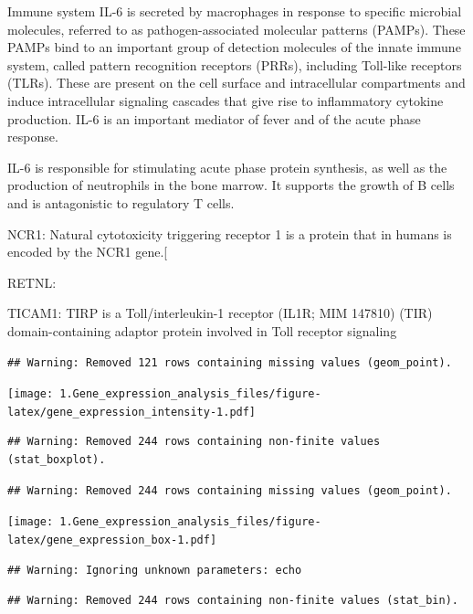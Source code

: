 \documentclass[
]{article}
\begin{document}
Immune system IL-6 is secreted by macrophages in response to specific
microbial molecules, referred to as pathogen-associated molecular
patterns (PAMPs). These PAMPs bind to an important group of detection
molecules of the innate immune system, called pattern recognition
receptors (PRRs), including Toll-like receptors (TLRs). These are
present on the cell surface and intracellular compartments and induce
intracellular signaling cascades that give rise to inflammatory cytokine
production. IL-6 is an important mediator of fever and of the acute
phase response.

IL-6 is responsible for stimulating acute phase protein synthesis, as
well as the production of neutrophils in the bone marrow. It supports
the growth of B cells and is antagonistic to regulatory T cells.

NCR1: Natural cytotoxicity triggering receptor 1 is a protein that in
humans is encoded by the NCR1 gene.{[}

RETNL:

TICAM1: TIRP is a Toll/interleukin-1 receptor (IL1R; MIM 147810) (TIR)
domain-containing adaptor protein involved in Toll receptor signaling

\begin{verbatim}
## Warning: Removed 121 rows containing missing values (geom_point).
\end{verbatim}

\texttt{[image: 1.Gene\_expression\_analysis\_files/figure-latex/gene\_expression\_intensity-1.pdf]}

\begin{verbatim}
## Warning: Removed 244 rows containing non-finite values (stat_boxplot).
\end{verbatim}

\begin{verbatim}
## Warning: Removed 244 rows containing missing values (geom_point).
\end{verbatim}

\texttt{[image: 1.Gene\_expression\_analysis\_files/figure-latex/gene\_expression\_box-1.pdf]}

\begin{verbatim}
## Warning: Ignoring unknown parameters: echo
\end{verbatim}

\begin{verbatim}
## Warning: Removed 244 rows containing non-finite values (stat_bin).
\end{verbatim}
\end{document}
